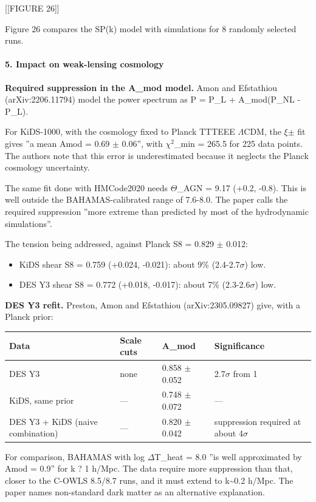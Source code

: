 \documentclass[11pt,a4paper]{article}
\begin{document}
[[FIGURE 26]]

Figure 26 compares the SP(k) model with simulations for 8 randomly selected runs.

\paragraph{5. Impact on weak-lensing cosmology}
\textbf{Required suppression in the A\_mod model.} Amon and Efstathiou (arXiv:2206.11794) model the power spectrum as P = P\_L + A\_mod(P\_NL - P\_L).

For KiDS-1000, with the cosmology fixed to Planck TTTEEE $\Lambda$CDM, the $\xi$$\pm$ fit gives ''a mean Amod = 0.69 $\pm$ 0.06'', with $\chi$$^2$\_min = 265.5 for 225 data points. The authors note that this error is underestimated because it neglects the Planck cosmology uncertainty.

The same fit done with HMCode2020 needs $\Theta$\_AGN = 9.17 (+0.2, -0.8). This is well outside the BAHAMAS-calibrated range of 7.6-8.0. The paper calls the required suppression ''more extreme than predicted by most of the hydrodynamic simulations''.

The tension being addressed, against Planck S8 = 0.829 $\pm$ 0.012:

\begin{itemize}
  \item KiDS shear S8 = 0.759 (+0.024, -0.021): about 9\% (2.4-2.7$\sigma$) low.
  \item DES Y3 shear S8 = 0.772 (+0.018, -0.017): about 7\% (2.3-2.6$\sigma$) low.
\end{itemize}
\textbf{DES Y3 refit.} Preston, Amon and Efstathiou (arXiv:2305.09827) give, with a Planck prior:

\begin{longtable}{@{}p{}p{}p{}p{}@{}}
\toprule
\textbf{Data} & \textbf{Scale cuts} & \textbf{A\_mod} & \textbf{Significance} \\ \midrule \endhead
DES Y3 & none & 0.858 $\pm$ 0.052 & 2.7$\sigma$ from 1 \\
KiDS, same prior & --- & 0.748 $\pm$ 0.072 & --- \\
DES Y3 + KiDS (naive combination) & --- & 0.820 $\pm$ 0.042 & suppression required at about 4$\sigma$ \\
\bottomrule\end{longtable}
For comparison, BAHAMAS with log $\Delta$T\_heat = 8.0 ''is well approximated by Amod = 0.9'' for k ? 1 h/Mpc. The data require more suppression than that, closer to the C-OWLS 8.5/8.7 runs, and it must extend to k\textasciitilde{}0.2 h/Mpc. The paper names non-standard dark matter as an alternative explanation.
\end{document}
